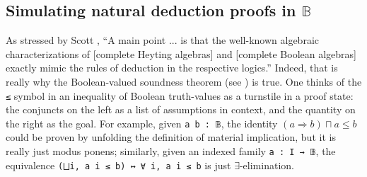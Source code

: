 \documentclass[sigplan,10pt,review, anonymous]{acmart}
\newcommand{\lil}{\lstinline}
\theoremstyle{definition}
\begin{document}
\subsection{Simulating natural deduction proofs in \texorpdfstring{\(\mathbb{B}\)}{B}} \label{subsect:natded}
As stressed by Scott \cite{scott2008algebraic}, ``A main point ... is that the well-known algebraic characterizations of [complete Heyting algebras] and [complete Boolean algebras] exactly mimic the rules of deduction in the respective logics.''
Indeed, that is really why the Boolean-valued soundness theorem (see ) is true. One thinks of the \lil{≤} symbol in an inequality of Boolean truth-values as a turnstile in a proof state:
the conjuncts on the left as a list of assumptions in context, and the quantity on the right as the goal.
For example, given \lil{a b : 𝔹}, the identity $(a \Rightarrow b) \sqcap a \leq b$ could be proven by unfolding the definition of material implication, but it is really just modus ponens;
similarly, given an indexed family \lil{a : I → 𝔹}, the equivalence \lstinline{(⨆i, a i ≤ b) ↔ ∀ i, a i ≤ b} is just $\exists$-elimination.
\end{document}
